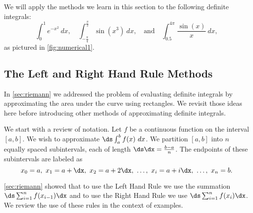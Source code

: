 We will apply the methods we learn in this section to the following definite integrals:
\[
 \int_0^1 e^{-x^2} \ dx, \quad
 \int_{-\frac{\pi}{4}}^{\frac{\pi}{2}} \sin(x^3) \ dx,
 \quad \text{and} \quad
 \int_{0.5}^{4\pi} \frac{\sin(x)}{x} \ dx,
\]
as pictured in \autoref{fig:numerical1}.

\subsection{The Left and Right Hand Rule Methods}

In \autoref{sec:riemann} we addressed the problem of evaluating definite integrals by approximating the area under the curve using rectangles. We revisit those ideas here before introducing other methods of approximating definite integrals. 

We start with a review of notation. Let $f$ be a continuous function on the interval $[a,b]$. We wish to approximate $\ds \int_a^b f(x)\ dx$. We partition $[a,b]$ into $n$ equally spaced subintervals, each of length $\ds\dx = \frac{b-a}{n}$. The endpoints of these subintervals are labeled as
\[x_0=a,\ x_1 = a+\dx,\ x_2 = a+ 2\dx,\ \dotsc,\ x_i = a+i\dx,\ \dotsc,\ x_n = b.\]

\autoref{sec:riemann} showed that to use the Left Hand Rule we use the summation $\ds \sum_{i=1}^n f(x_{i-1})\dx$ and to use the Right Hand Rule we use $\ds \sum_{i=1}^n f(x_i)\dx$. We review the use of these rules in the context of examples.

